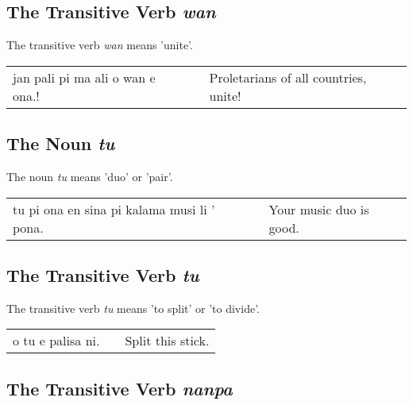 %
\subsection*{The Transitive Verb \textit{wan}}
%
%
The transitive verb \textit{wan} means 'unite'. 

\begin{supertabular}{p{5,5cm}|ll}
jan pali pi ma ali o wan e ona.! && Proletarians of all countries, unite! \\
\end{supertabular} 

%
\subsection*{The Noun \textit{tu}}
%
%
The noun \textit{tu} means 'duo' or 'pair'.

\begin{supertabular}{p{5,5cm}|ll}
tu pi ona en sina pi kalama musi li ' pona. && Your music duo is good. \\ 
\end{supertabular} 

%
%
\subsection*{The Transitive Verb \textit{tu}}
%
%
The transitive verb \textit{tu} means 'to split' or 'to divide'. 

\begin{supertabular}{p{5,5cm}|ll}
o tu e palisa ni. && Split this stick.  \\
\end{supertabular} 

%
%
\subsection*{The Transitive Verb \textit{nanpa}}
%
%

